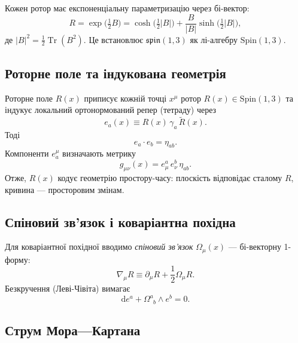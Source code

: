 \documentclass[11pt,a4paper]{article}
\numberwithin{equation}{section}
\theoremstyle{plain}
\theoremstyle{definition}
\theoremstyle{remark}
\DeclareMathOperator{\Tr}{Tr}
\newcommand{\dd}{\mathrm{d}}
\begin{document}
Кожен ротор має експоненціальну параметризацію через бі-вектор:
\begin{equation}
R = \exp\!\big(\tfrac{1}{2}B\big) = \cosh\!\big(\tfrac{1}{2}|B|\big) + \frac{B}{|B|}\sinh\!\big(\tfrac{1}{2}|B|\big),
\end{equation}
де $|B|^2 = \frac{1}{2}\Tr(B^2)$. Це встановлює $\mathfrak{spin}(1,3)$ як лі-алгебру $\mathrm{Spin}(1,3)$.

\subsection{Роторне поле та індукована геометрія}

Роторне поле $R(x)$ приписує кожній точці $x^\mu$ ротор $R(x) \in \mathrm{Spin}(1,3)$ та індукує локальний ортонормований репер (тетраду) через
\begin{equation}
e_a(x) \equiv R(x)\, \gamma_a\, \widetilde{R}(x).
\label{eq:tetrad-def}
\end{equation}
Тоді
\begin{equation}
e_a \cdot e_b = \eta_{ab}.
\end{equation}
Компоненти $e_a^\mu$ визначають метрику
\begin{equation}
g_{\mu\nu}(x) = e_\mu^a\, e_\nu^b\, \eta_{ab}.
\label{eq:metric-def}
\end{equation}
Отже, $R(x)$ кодує геометрію простору-часу: плоскість відповідає сталому $R$, кривина — просторовим змінам.

\subsection{Спіновий зв’язок і коваріантна похідна}

Для коваріантної похідної вводимо \emph{спіновий зв’язок} $\Omega_\mu(x)$ — бі-векторну 1-форму:
\begin{equation}
\nabla_\mu R \equiv \partial_\mu R + \frac{1}{2}\Omega_\mu R.
\label{eq:covariant-def}
\end{equation}
Безкручення (Леві-Чівіта) вимагає
\begin{equation}
\dd e^a + \Omega^a_{\phantom{a}b} \wedge e^b = 0.
\label{eq:torsion-free}
\end{equation}

\subsection{Струм Мора—Картана}
\end{document}
